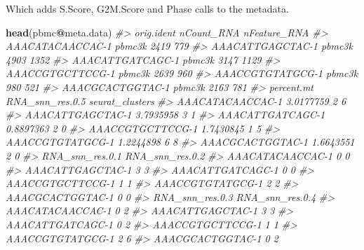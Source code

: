\documentclass[
]{book}
\newenvironment{Shaded}{\begin{snugshade}}{\end{snugshade}}
\newcommand{\CommentTok}[1]{\textcolor[rgb]{0.56,0.35,0.01}{\textit{#1}}}
\newcommand{\FunctionTok}[1]{\textcolor[rgb]{0.13,0.29,0.53}{\textbf{#1}}}
\newcommand{\NormalTok}[1]{#1}
\newcommand{\SpecialCharTok}[1]{\textcolor[rgb]{0.81,0.36,0.00}{\textbf{#1}}}
\begin{document}
Which adds S.Score, G2M.Score and Phase calls to the metadata.

\begin{Shaded}
\begin{Highlighting}[]
\FunctionTok{head}\NormalTok{(pbmc}\SpecialCharTok{@}\NormalTok{meta.data)}
\CommentTok{\#\textgreater{}                  orig.ident nCount\_RNA nFeature\_RNA}
\CommentTok{\#\textgreater{} AAACATACAACCAC{-}1     pbmc3k       2419          779}
\CommentTok{\#\textgreater{} AAACATTGAGCTAC{-}1     pbmc3k       4903         1352}
\CommentTok{\#\textgreater{} AAACATTGATCAGC{-}1     pbmc3k       3147         1129}
\CommentTok{\#\textgreater{} AAACCGTGCTTCCG{-}1     pbmc3k       2639          960}
\CommentTok{\#\textgreater{} AAACCGTGTATGCG{-}1     pbmc3k        980          521}
\CommentTok{\#\textgreater{} AAACGCACTGGTAC{-}1     pbmc3k       2163          781}
\CommentTok{\#\textgreater{}                  percent.mt RNA\_snn\_res.0.5 seurat\_clusters}
\CommentTok{\#\textgreater{} AAACATACAACCAC{-}1  3.0177759               2               6}
\CommentTok{\#\textgreater{} AAACATTGAGCTAC{-}1  3.7935958               3               1}
\CommentTok{\#\textgreater{} AAACATTGATCAGC{-}1  0.8897363               2               0}
\CommentTok{\#\textgreater{} AAACCGTGCTTCCG{-}1  1.7430845               1               5}
\CommentTok{\#\textgreater{} AAACCGTGTATGCG{-}1  1.2244898               6               8}
\CommentTok{\#\textgreater{} AAACGCACTGGTAC{-}1  1.6643551               2               0}
\CommentTok{\#\textgreater{}                  RNA\_snn\_res.0.1 RNA\_snn\_res.0.2}
\CommentTok{\#\textgreater{} AAACATACAACCAC{-}1               0               0}
\CommentTok{\#\textgreater{} AAACATTGAGCTAC{-}1               3               3}
\CommentTok{\#\textgreater{} AAACATTGATCAGC{-}1               0               0}
\CommentTok{\#\textgreater{} AAACCGTGCTTCCG{-}1               1               1}
\CommentTok{\#\textgreater{} AAACCGTGTATGCG{-}1               2               2}
\CommentTok{\#\textgreater{} AAACGCACTGGTAC{-}1               0               0}
\CommentTok{\#\textgreater{}                  RNA\_snn\_res.0.3 RNA\_snn\_res.0.4}
\CommentTok{\#\textgreater{} AAACATACAACCAC{-}1               0               2}
\CommentTok{\#\textgreater{} AAACATTGAGCTAC{-}1               3               3}
\CommentTok{\#\textgreater{} AAACATTGATCAGC{-}1               0               2}
\CommentTok{\#\textgreater{} AAACCGTGCTTCCG{-}1               1               1}
\CommentTok{\#\textgreater{} AAACCGTGTATGCG{-}1               2               6}
\CommentTok{\#\textgreater{} AAACGCACTGGTAC{-}1               0               2}

\end{Highlighting}
\end{Shaded}
\end{document}
